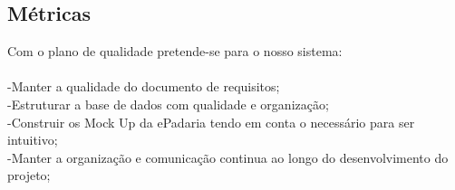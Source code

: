 \subsection{Métricas}
Com o plano de qualidade pretende-se para o nosso sistema:\\
\\
-Manter a qualidade do documento de requisitos;\\
-Estruturar a base de dados com qualidade e organização;\\
-Construir os Mock Up da ePadaria tendo em conta o necessário para ser intuitivo;\\
-Manter a organização e comunicação continua ao longo do desenvolvimento do projeto;\\